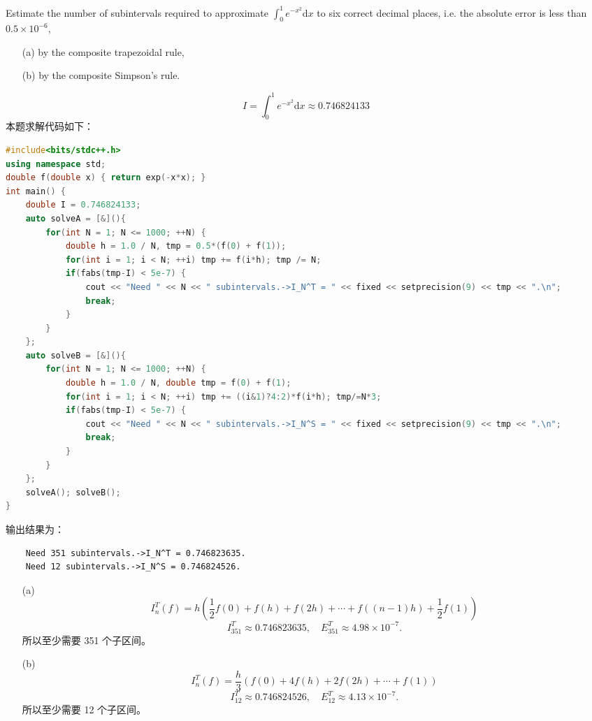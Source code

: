 \documentclass[lang=cn,a4paper,newtx,bibend=bibtex]{elegantpaper}
\newcommand{\dd}{\mathrm{d}}
\newcommand{\Int}[4]{\int_{#1}^{#2}{#3}{\dd {#4}}}
\begin{document}
\begin{prob}[6.6.1-\textrm{II}]
  Estimate the number of subintervals required to approximate
  $\Int{0}{1}{e^{-x^2}}{x}$ to six correct decimal places, i.e. the absolute
  error is less than $0.5\times 10^{-6}$,
  \begin{enumerate}
    \item[(a)] by the composite trapezoidal rule,
    \item[(b)] by the composite Simpson's rule. 
  \end{enumerate}
\end{prob}

\begin{solution}
  \[I = \Int{0}{1}{e^{-x^2}}{x} \approx 0.746824133\]
  本题求解代码如下：
  \begin{lstlisting}[language=C++]
#include<bits/stdc++.h>
using namespace std;
double f(double x) { return exp(-x*x); }
int main() {
    double I = 0.746824133;
    auto solveA = [&](){
        for(int N = 1; N <= 1000; ++N) {
            double h = 1.0 / N, tmp = 0.5*(f(0) + f(1));
            for(int i = 1; i < N; ++i) tmp += f(i*h); tmp /= N;
            if(fabs(tmp-I) < 5e-7) {
                cout << "Need " << N << " subintervals.->I_N^T = " << fixed << setprecision(9) << tmp << ".\n";
                break;
            }
        }
    };
    auto solveB = [&](){
        for(int N = 1; N <= 1000; ++N) {
            double h = 1.0 / N, double tmp = f(0) + f(1);
            for(int i = 1; i < N; ++i) tmp += ((i&1)?4:2)*f(i*h); tmp/=N*3;
            if(fabs(tmp-I) < 5e-7) {
                cout << "Need " << N << " subintervals.->I_N^S = " << fixed << setprecision(9) << tmp << ".\n";
                break;
            }
        }
    };
    solveA(); solveB();
}
  \end{lstlisting}
  输出结果为：
  \begin{lstlisting}
    Need 351 subintervals.->I_N^T = 0.746823635.
    Need 12 subintervals.->I_N^S = 0.746824526.
  \end{lstlisting}
  \begin{enumerate}
  
    \item[(a)]
  \[I_n^T(f) = h\left(\frac12 f(0) + f(h) + f(2h) + \cdots + f((n - 1)h) + \frac12f(1)\right)\] 
  \[I_{351}^{T} \approx 0.746823635,\quad E_{351}^{T} \approx 4.98\times 10^{-7}.\]
    所以至少需要 351 个子区间。
  \item[(b)] 
  \[I_n^T(f) = \frac{h}3\left(f(0) + 4f(h) + 2f(2h) + \cdots + f(1)\right)\] 
  \[I_{12}^{T} \approx 0.746824526,\quad E_{12}^{T} \approx 4.13\times 10^{-7}.\]
    所以至少需要 12 个子区间。
  \end{enumerate}
\end{solution}
\end{document}

